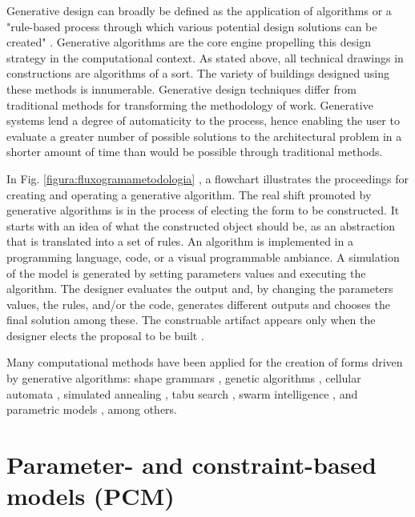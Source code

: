 \documentclass[preprint,12pt,3p]{elsarticle}
\begin{document}
Generative design can broadly be defined as the application of algorithms or a "rule-based process through which various potential design solutions can be created" \cite{fasoulaki2008}. Generative algorithms are the core engine propelling this design strategy in the computational context. As stated above, all technical drawings in constructions are algorithms of a sort. The variety of buildings designed using these methods is innumerable. Generative design techniques differ from traditional methods for transforming the methodology of work. Generative systems lend a degree of automaticity to the process, hence enabling the user to evaluate a greater number of possible solutions to the architectural problem in a shorter amount of time than would be possible through traditional methods.


In Fig. \ref{figura:fluxogramametodologia} \cite{bohnacker2012}, a flowchart illustrates the proceedings for creating and operating a generative algorithm. The real shift promoted by generative algorithms is in the process of electing the form to be constructed. It starts with an idea of what the constructed object should be, as an abstraction that is translated into a set of rules. An algorithm is implemented in a programming language, code, or a visual programmable ambiance. A simulation of the model is generated by setting parameters values and executing the algorithm. The designer evaluates the output and, by changing the parameters values, the rules, and/or the code, generates different outputs and chooses the final solution among these. The construable artifact appears only when the designer elects the proposal to be built \cite{DIno2012}.

Many computational methods have been applied for the creation of forms driven by generative algorithms: shape grammars \cite{stiny1972} \cite{Stiny1978} \cite{duarte2005} \cite{tepavcevic2012}, genetic algorithms \cite{caldas1999} \cite{fasoulaki2008} \cite{Troiano2012} \cite{Caldas2002}, cellular automata  \cite{Herr2007}, simulated annealing \cite{Ceranic2001} \cite{Correia2001} \cite{Lamberti2008}, tabu search \cite{Bland1991}, swarm intelligence \cite{Luh2011} \cite{Yahya2014}, and parametric models \cite{Turrin2011} \cite{Fischer2005} \cite{lachauer2011a} \cite{Milena2010a}, among others.

\section{Parameter- and constraint-based models (PCM)}
\label{ParamConst}
\end{document}
